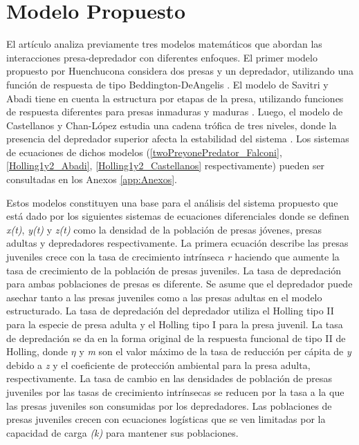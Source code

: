 \documentclass{wscpaperproc}
\theoremstyle{wsc}
\begin{document}
\section{Modelo Propuesto}

El artículo analiza previamente tres modelos matemáticos que abordan las interacciones presa-depredador con diferentes enfoques. El
primer modelo propuesto por Huenchucona considera dos presas y un depredador, utilizando una
función de respuesta de tipo Beddington-DeAngelis \cite{falconi_stability_2015}. El modelo de Savitri y Abadi tiene en cuenta la estructura
por etapas de la presa, utilizando funciones de respuesta diferentes para presas inmaduras y maduras \cite{savitri_dynamics_2018}. Luego, el
modelo de Castellanos y Chan-López estudia una cadena trófica de tres niveles, donde la presencia del depredador
superior afecta la estabilidad del sistema \cite{castellanos_existence_2017}. Los sistemas de ecuaciones de dichos modelos (\ref{twoPreyonePredator_Falconi}, \ref{Holling1y2_Abadi},
\ref{Holling1y2_Castellanos} respectivamente) pueden ser consultadas en los Anexos \ref{app:Anexos}.\par

Estos modelos constituyen una base para el análisis
del sistema propuesto que está dado por los siguientes sistemas de ecuaciones diferenciales donde se definen \emph{x(t)}, \emph{y(t)} y \emph{z(t)} como la
densidad de la poblaci\'on de presas j\'ovenes, presas adultas y depredadores respectivamente.
La primera ecuación describe las presas juveniles crece con la tasa de crecimiento intrínseca \emph{r} haciendo que aumente la tasa de crecimiento de la población de
presas juveniles. La tasa de depredación para ambas poblaciones de presas es diferente. Se asume que el depredador puede asechar
tanto a las presas juveniles como a las presas adultas en el modelo estructurado. La tasa de depredación del depredador utiliza el Holling tipo II
para la especie de presa adulta y el Holling tipo I para la presa juvenil. La tasa de depredación se da en la forma original de la respuesta funcional
de tipo II de Holling, donde $\eta$  y \emph{m} son el valor máximo de la tasa de reducción per cápita de \emph{y} debido a \emph{z} y el coeficiente
de protección ambiental para la presa adulta, respectivamente. La tasa de cambio en las densidades de población de presas juveniles por las tasas de crecimiento intrínsecas se
reducen por la tasa a la que las presas juveniles son consumidas por los depredadores. Las poblaciones de presas juveniles crecen con ecuaciones logísticas
que se ven limitadas por la capacidad de carga \emph{(k)} para mantener sus poblaciones.\par
\end{document}
